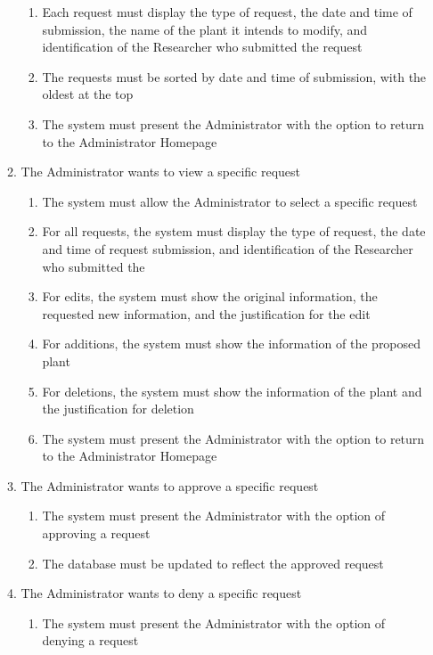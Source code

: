 \documentclass[]{article}
\begin{document}
\begin{enumerate}[{VP}1.]
\begin{enumerate}[{BE3}.1]
\begin{enumerate}
	        \item Each request must display the type of request, the date and time of submission, the name of the plant it intends to modify, and identification of the Researcher who submitted the request
	        \item The requests must be sorted by date and time of submission, with the oldest at the top
	        \item The system must present the Administrator with the option to return to the Administrator Homepage
	    \end{enumerate}
	    \item The Administrator wants to view a specific request
	    \begin{enumerate}
	        \item The system must allow the Administrator to select a specific request
	        \item For all requests, the system must display the type of request, the date and time of request submission, and identification of the Researcher who submitted the
	        \item For edits, the system must show the original information, the requested new information, and the justification for the edit
	        \item For additions, the system must show the information of the proposed plant
	        \item For deletions, the system must show the information of the plant and the justification for deletion
	        \item The system must present the Administrator with the option to return to the Administrator Homepage
	    \end{enumerate}
	    \item The Administrator wants to approve a specific request
	    \begin{enumerate}
	        \item The system must present the Administrator with the option of approving a request
	        \item The database must be updated to reflect the approved request
	    \end{enumerate}
	     \item The Administrator wants to deny a specific request
	    \begin{enumerate}
	        \item The system must present the Administrator with the option of denying a request
	    \end{enumerate}

\end{enumerate}
\end{enumerate}
\end{document}
